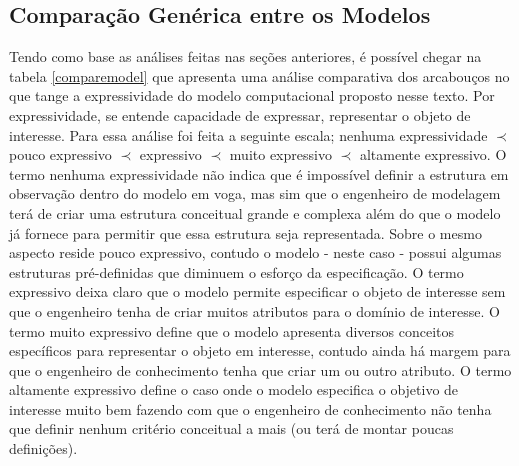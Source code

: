 \subsection{Comparação Genérica entre os Modelos}

Tendo como base as análises feitas nas seções anteriores, é possível chegar na tabela \ref{comparemodel} que apresenta uma análise comparativa dos arcabouços no que tange a expressividade do modelo computacional proposto nesse texto. Por expressividade, se entende capacidade de expressar, representar o objeto de interesse. Para essa análise 
foi feita a seguinte escala; nenhuma expressividade $\prec$ pouco expressivo $\prec$ expressivo $\prec$ muito expressivo $\prec$ altamente expressivo. O termo nenhuma expressividade 
não indica que é impossível definir a estrutura em observação dentro do modelo em voga, mas sim que o engenheiro de modelagem terá de criar uma estrutura conceitual grande e complexa além do que o modelo já fornece para permitir que essa estrutura seja representada. Sobre o mesmo aspecto reside pouco expressivo, contudo o modelo - neste caso - possui algumas estruturas pré-definidas que diminuem o esforço da especificação. O termo expressivo deixa claro que o modelo permite especificar o objeto de interesse sem que o engenheiro tenha de criar muitos atributos para o domínio de interesse. O termo muito expressivo define que o modelo apresenta diversos conceitos específicos para representar o objeto em interesse, contudo ainda há margem para que o engenheiro de conhecimento tenha que criar um ou outro atributo. O termo altamente expressivo define o caso onde o modelo especifica o objetivo de interesse muito bem fazendo com que o engenheiro de conhecimento não tenha que definir nenhum critério conceitual a mais (ou terá de montar poucas definições).   

